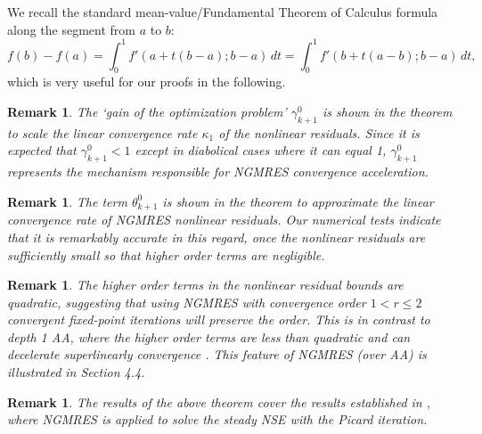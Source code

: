 \documentclass{article}
\numberwithin{equation}{section}
\newtheorem{remark}[thm]{Remark}
\begin{document}
We recall the standard mean-value/Fundamental Theorem of Calculus formula along the segment from $a$ to $b$:  
$$f(b)-f(a)=\int_0^1 f'(a+t(b-a);b-a)\,dt=\int_0^1 f'(b+t(a-b);b-a)\,dt,$$
which is very useful for our proofs in the following.
 

 
\begin{remark} The `gain of the optimization problem'  $\gamma^0_{k+1}$ is shown in the theorem to scale the linear convergence rate $\kappa_1$ of the nonlinear residuals.  Since it is expected that $\gamma^0_{k+1} < 1$ except in diabolical cases where it can equal 1, $\gamma^0_{k+1}$ represents the mechanism responsible for NGMRES convergence acceleration.
\end{remark}
\begin{remark}
The term $\theta_{k+1}^0$ is shown in the theorem to approximate the linear convergence rate of NGMRES nonlinear residuals.  Our numerical tests indicate that it is remarkably accurate in this regard, once the nonlinear residuals are sufficiently small so that higher order terms are negligible.
\end{remark}
\begin{remark}
The higher order terms in the nonlinear residual bounds are quadratic, suggesting that using NGMRES with convergence order
$1<r\le 2$ convergent fixed-point iterations will preserve the order.  This is in contrast to depth 1 AA, where the higher order terms are less than quadratic and can decelerate superlinearly convergence \cite{X23,RX23}.  This feature of NGMRES (over AA) is illustrated in Section 4.4.
\end{remark}

\begin{remark}
The results of the above theorem cover the results established in \cite{HR26}, where NGMRES is applied to solve the steady NSE with the Picard iteration.
\end{remark}
\end{document}
